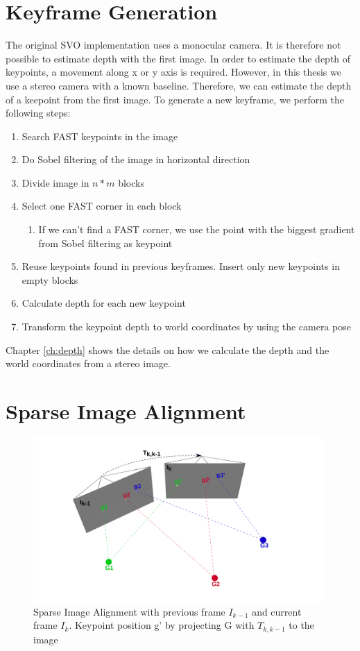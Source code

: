 \documentclass[11pt,a4paper,titlepage,oneside]{report}
\begin{document}
\section{Keyframe Generation}\label{sec:initialization}
The original SVO implementation uses a monocular camera. It is therefore not possible to estimate depth with the first image. In order to estimate the depth of keypoints, a movement along x or y axis is required. However, in this thesis we use a stereo camera with a known baseline. Therefore, we can estimate the depth of a keepoint from the first image. To generate a new keyframe, we perform the following steps:
\begin{enumerate}
  \item{Search FAST keypoints in the image \cite{fast}}
  \item{Do Sobel filtering of the image in horizontal direction}
  \item{Divide image in $n*m$ blocks}
  \item{Select one FAST corner in each block}
    \begin{enumerate}
      \item{If we can't find a FAST corner, we use the point with the biggest gradient from Sobel filtering as keypoint}
    \end{enumerate}
  \item{Reuse keypoints found in previous keyframes. Insert only new keypoints in empty blocks}
  \item{Calculate depth for each new keypoint}
  \item{Transform the keypoint depth to world coordinates by using the camera pose}
\end{enumerate}

Chapter \ref{ch:depth} shows the details on how we calculate the depth and the world coordinates from a stereo image.

\section{Sparse Image Alignment}\label{sec:sia}

\begin{figure}[H]
  \centering
  \includegraphics[width=0.99\textwidth]{img/pose_estimation_sparse.png}
  \caption{Sparse Image Alignment with previous frame $I_{k-1}$ and current frame $I_{k}$. Keypoint position g' by projecting G with $T_{k,k-1}$ to the image}
  \label{fig:sparse_image_alignment}
\end{figure}
\end{document}
